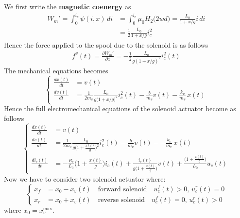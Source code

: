 \documentclass[11pt,a4paper,oneside]{book}
\numberwithin{equation}{section}
\theoremstyle{it}
\theoremstyle{definition}
\begin{document}
We first write the \textbf{magnetic coenergy} as
\begin{equation}\label{solenoid_mech_eq_1}
	\begin{split}
		W_m'=\int_{0}^{i_c}\psi(i,x)\,di &= \int_{0}^{i_c}\mu_0H_2\Big(2wd\Big)=\frac{L_0}{1+x/g}i\,di\\[6pt]
		&=\frac{1}{2}\frac{L_0}{1+x/g}i_c^2
	\end{split}
\end{equation}
Hence the force applied to the spool due to the solenoid is as follows
\begin{equation}\label{solenoid_mech_eq_2}
	\begin{split}
		f^v(t)=\frac{\partial W_m'}{\partial x} = -\frac{1}{2}\frac{L_0}{g(1+x/g)^2}i_c^2(t)
	\end{split} 
\end{equation}
The mechanical equations becomes
\begin{equation}\label{solenoid_mech_eq_3}
	\left\lbrace \begin{aligned}
		\frac{dx(t)}{dt} &= v(t) \\[6pt]
		\frac{dv(t)}{dt} &= \frac{1}{2m_v}\frac{L_0}{g\Big(1+x/g\Big)^2}i_c^2(t)-\frac{b}{m_v} v(t)-\frac{k_v}{m_v}\,x(t)
	\end{aligned}\right. 
\end{equation}
Hence the full electromechanical equations of the solenoid actuator become as follows
\begin{equation}\label{solenoid_mech_eq_4}
	\left\lbrace \begin{aligned}
		\frac{dx(t)}{dt} &= v(t) \\[6pt]
		\frac{dv(t)}{dt} &= \frac{1}{2m_v}\frac{L_0}{g\Big(1+\frac{x(t)}{g}\Big)^2}i_c^2(t)-\frac{b}{m_v} v(t) - -\frac{k_v}{m_v}\,x(t)\\[6pt]
		\frac{di_c(t)}{dt} &=-\frac{R_c}{L_0}\Big(1+\frac{x(t)}{g}\Big)i_c(t)+\frac{i_c(t)}{g\Big(1+\frac{x(t)}{g}\Big)}v(t) +\frac{\Big(1+\frac{x(t)}{g}\Big)}{L_0}u_c(t)
	\end{aligned}\right. 
\end{equation}
Now we have to consider two solenoid actuator where:
\begin{equation*}\label{}
	\left\lbrace \begin{aligned}
		x_f &= x_0 - x_v(t) \quad\text{forward solenoid} \quad u_c^f(t)>0,\,u_c^r(t)=0\\[6pt]
		x_r &= x_0 + x_v(t) \quad\text{reverse solenoid} \quad u_c^f(t)=0,\,u_c^r(t)>0
	\end{aligned}\right. 
\end{equation*}
where $x_0=x_v^{\text{max}}$.
\end{document}
